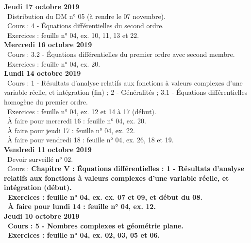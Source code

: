 \documentclass[12pt,a4paper]{article}
\begin{document}
\noindent\textbf{Jeudi 17 octobre 2019}\\
\bu\ Distribution du DM n° 05 (à rendre le 07 novembre).\\
\bu\ Cours : 4 - Équations différentielles du second ordre.\\
\bu\ Exercices : feuille n° 04, ex. 10, 11, 13 et 22.\vspace{.4cm}\\

\noindent\textbf{\bf Mercredi 16 octobre 2019}\\
\bu\ Cours : 3.2 - Équations différentielles du premier ordre avec second membre.\\
\bu\ Exercices : feuille n° 04, ex. 20.\vspace{.4cm}\\
  
\noindent\textbf{Lundi 14 octobre 2019}\\
\bu\ Cours : 1 - Résultats d'analyse relatifs aux fonctions à valeurs complexes d'une variable réelle, et 
intégration (fin) ; 2 - Généralités ; 3.1 - Équations différentielles homogène du premier ordre.\\
\bu\ Exercices : feuille n° 04, ex. 12 et 14 à 17 (début).\\
\bu\ À faire pour mercredi 16 : feuille n° 04, ex. 20.\\
\bu\ À faire pour jeudi 17 : feuille n° 04, ex. 22.\\
\bu\ À faire pour vendredi 18 : feuille n° 04, ex. 26, 18 et 19.\vspace{.4cm}\\
  
\noindent\textbf{Vendredi 11 octobre 2019}\\
\bu\ Devoir surveillé n° 02.\\
 \bu\ Cours : \bf Chapitre V \rm : Équations différentielles : 1 - Résultats d'analyse relatifs aux fonctions à 
valeurs complexes d'une variable réelle, et intégration (début).\\
 \bu\ Exercices : feuille n° 04, ex. ex. 07 et 09, et début du 08.\\
 \bu\ À faire pour lundi 14 : feuille n° 04, ex. 12.\vspace{.4cm}\\
  
 \noindent\textbf{Jeudi 10 octobre 2019}\\
 \bu\ Cours : 5 - Nombres complexes et géométrie plane.\\
 \bu\ Exercices : feuille n° 04, ex. 02, 03, 05 et 06.\vspace{.4cm}\\
  
\end{document}
